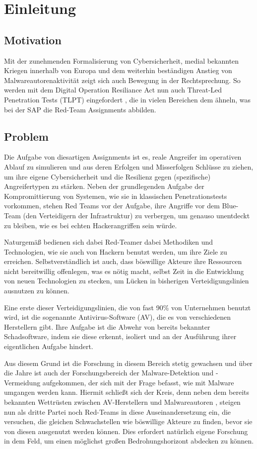 \chapter{Einleitung}
\section{Motivation}
Mit der zunehmenden Formalisierung von Cybersicherheit, medial bekannten Kriegen innerhalb von Europa und dem weiterhin beständigen Anstieg von Malwareautoren\-aktivität zeigt sich auch Bewegung in der Rechtsprechung. So werden mit dem Digital Operation Resiliance Act  nun auch Threat-Led Penetration Tests (TLPT) eingefordert \cite{ab_2024_tlpt,europischesparlaments_2022_digitale}, die in vielen Bereichen dem ähneln, was bei der SAP die Red-Team Assignments abbilden. 

\section{Problem}
Die Aufgabe von diesartigen Assignments ist es, reale Angreifer im operativen Ablauf zu simulieren und aus deren Erfolgen und Misserfolgen Schlüsse zu ziehen, um ihre eigene Cybersicherheit und die Resilienz gegen (spezifische) Angreifertypen zu stärken.
Neben der grundlegenden Aufgabe der Kompromittierung von Systemen, wie sie in klassischen Penetrationstests vorkommen, stehen Red Teams vor der Aufgabe, ihre Angriffe vor dem Blue-Team (den Verteidigern der Infrastruktur) zu verbergen, um genauso unentdeckt zu bleiben, wie es bei echten Hackerangriffen sein würde.

Naturgemäß bedienen sich dabei Red-Teamer dabei Methodiken und Technologien, wie sie auch von Hackern benutzt werden, um ihre Ziele zu erreichen. Selbstverständlich ist auch, dass böswillige Akteure ihre Ressourcen nicht bereitwillig offenlegen, was es nötig macht, selbst Zeit in die Entwicklung von neuen Technologien zu stecken, um Lücken in bisherigen Verteidigungslinien ausnutzen zu können.

 Eine erste dieser Verteidigungslinien, die von fast 90\% \cite{dey_2024_antivirus} von Unternehmen benutzt wird, ist die sogenannte Antivirus-Software (AV), die es von verschiedenen Herstellern gibt. Ihre Aufgabe ist die Abwehr von bereits bekannter Schadsoftware, indem sie diese erkennt, isoliert und an der Ausführung ihrer eigentlichen Aufgabe hindert.

Aus diesem Grund ist die Forschung in diesem Bereich stetig gewachsen und über die Jahre ist auch der Forschungsbereich der Malware-Detektion und -Vermeidung aufgekommen, der sich mit der Frage befasst, wie mit Malware umgangen werden kann. Hiermit schließt sich der Kreis, denn neben dem bereits bekannten Wettrüsten zwischen AV-Herstellern und Malwareautoren \cite{alejandro_2024_a}, steigen nun als dritte Partei noch Red-Teams in diese Auseinandersetzung ein, die versuchen, die gleichen Schwachstellen wie böswillige Akteure zu finden, bevor sie von diesen ausgenutzt werden können. Dies erfordert natürlich eigene Forschung in dem Feld, um einen möglichst großen Bedrohungshorizont abdecken zu können.

